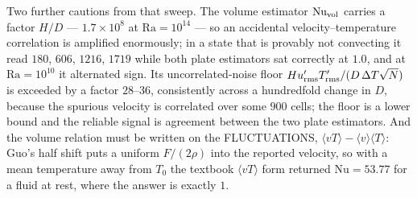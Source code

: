 \documentclass[11pt,a4paper]{article}
\newcommand{\e}[1]{\times 10^{#1}}
\begin{document}
\begin{enumerate}[leftmargin=1.4em,itemsep=4pt]
  Two further cautions from that sweep. The volume estimator
  $\mathrm{Nu}_{\rm vol}$ carries a factor $H/D$ --- $1.7\e{8}$ at
  $\mathrm{Ra}=10^{14}$ --- so an accidental velocity--temperature correlation is
  amplified enormously; in a state that is provably not convecting it read
  $180$, $606$, $1216$, $1719$ while both plate estimators sat correctly at
  $1.0$, and at $\mathrm{Ra}=10^{10}$ it alternated sign. Its uncorrelated-noise
  floor $H u'_{\rm rms}T'_{\rm rms}/(D\,\Delta T\sqrt{N})$ is exceeded by a
  factor $28$--$36$, consistently across a hundredfold change in $D$, because
  the spurious velocity is correlated over some $900$ cells; the floor is a
  lower bound and the reliable signal is agreement between the two plate
  estimators. And the volume relation must be written on the FLUCTUATIONS,
  $\langle v T\rangle-\langle v\rangle\langle T\rangle$: Guo's half shift puts
  a uniform $F/(2\rho)$ into the reported velocity, so with a mean temperature
  away from $T_0$ the textbook $\langle vT\rangle$ form returned
  $\mathrm{Nu}=53.77$ for a fluid at rest, where the answer is exactly $1$.
\end{enumerate}
\end{document}
